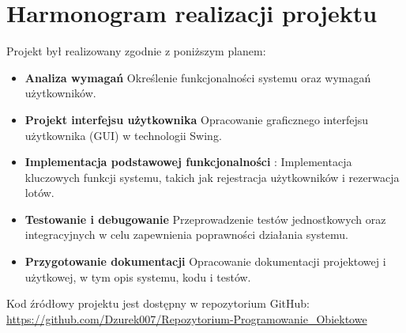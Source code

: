 \section{Harmonogram realizacji projektu}

Projekt był realizowany zgodnie z poniższym planem:

\begin{itemize}
\item \textbf{Analiza wymagań}  Określenie funkcjonalności systemu oraz wymagań użytkowników.
\item \textbf{Projekt interfejsu użytkownika} Opracowanie graficznego interfejsu użytkownika (GUI) w technologii Swing.
\item \textbf{Implementacja podstawowej funkcjonalności} : Implementacja kluczowych funkcji systemu, takich jak rejestracja użytkowników i rezerwacja lotów.
\item \textbf{Testowanie i debugowanie} Przeprowadzenie testów jednostkowych oraz integracyjnych w celu zapewnienia poprawności działania systemu.
\item \textbf{Przygotowanie dokumentacji}  Opracowanie dokumentacji projektowej i użytkowej, w tym opis systemu, kodu i testów.
\end{itemize}


Kod źródłowy projektu jest dostępny w repozytorium GitHub: \url{https://github.com/Dzurek007/Repozytorium-Programowanie_Obiektowe}